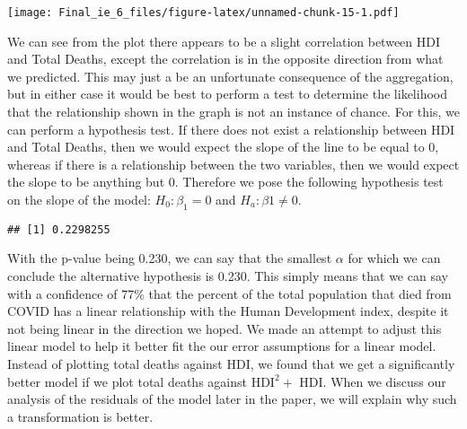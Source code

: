 \documentclass[
  12pt,
]{article}
\newenvironment{Shaded}{\begin{snugshade}}{\end{snugshade}}
\newcommand{\DecValTok}[1]{\textcolor[rgb]{0.00,0.00,0.81}{#1}}
\newcommand{\FunctionTok}[1]{\textcolor[rgb]{0.00,0.00,0.00}{#1}}
\newcommand{\NormalTok}[1]{#1}
\newcommand{\OtherTok}[1]{\textcolor[rgb]{0.56,0.35,0.01}{#1}}
\newcommand{\SpecialCharTok}[1]{\textcolor[rgb]{0.00,0.00,0.00}{#1}}
\newcommand{\StringTok}[1]{\textcolor[rgb]{0.31,0.60,0.02}{#1}}
\begin{document}
\texttt{[image: Final\_ie\_6\_files/figure-latex/unnamed-chunk-15-1.pdf]}

We can see from the plot there appears to be a slight correlation
between HDI and Total Deaths, except the correlation is in the opposite
direction from what we predicted. This may just a be an unfortunate
consequence of the aggregation, but in either case it would be best to
perform a test to determine the likelihood that the relationship shown
in the graph is not an instance of chance. For this, we can perform a
hypothesis test. If there does not exist a relationship between HDI and
Total Deaths, then we would expect the slope of the line to be equal to
0, whereas if there is a relationship between the two variables, then we
would expect the slope to be anything but 0. Therefore we pose the
following hypothesis test on the slope of the model:
\(H_0: \beta_1 = 0\) and \(H_a: \beta1 \neq 0\).

\begin{Shaded}
\end{Shaded}

\begin{verbatim}
## [1] 0.2298255
\end{verbatim}

With the p-value being 0.230, we can say that the smallest \(\alpha\)
for which we can conclude the alternative hypothesis is 0.230. This
simply means that we can say with a confidence of 77\% that the percent
of the total population that died from COVID has a linear relationship
with the Human Development index, despite it not being linear in the
direction we hoped. We made an attempt to adjust this linear model to
help it better fit the our error assumptions for a linear model. Instead
of plotting total deaths against HDI, we found that we get a
significantly better model if we plot total deaths against
\(\text{HDI}^2+\text{ HDI}\). When we discuss our analysis of the
residuals of the model later in the paper, we will explain why such a
transformation is better.
\end{document}
